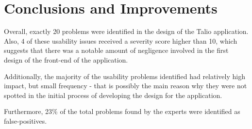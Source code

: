 \section{Conclusions and Improvements}

Overall, exactly 20 problems were identified in the design of the Talio application. Also, 4 of these usability issues received a severity score higher than 10, which suggests that there was a notable amount of negligence involved in the first design of the front-end of the application. 

Additionally, the majority of the usability problems identified had relatively high impact, but small frequency - that is possibly the main reason why they were not spotted in the initial process of developing the design for the application.

Furthermore, 23\% of the total problems found by the experts were identified as false-positives.